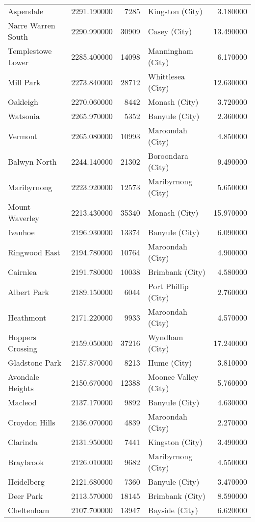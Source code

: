\begin{longtable}{lrrlr}
Aspendale & 2291.190000 & 7285 & Kingston (City) & 3.180000 \\
Narre Warren South & 2290.990000 & 30909 & Casey (City) & 13.490000 \\
Templestowe Lower & 2285.400000 & 14098 & Manningham (City) & 6.170000 \\
Mill Park & 2273.840000 & 28712 & Whittlesea (City) & 12.630000 \\
Oakleigh & 2270.060000 & 8442 & Monash (City) & 3.720000 \\
Watsonia & 2265.970000 & 5352 & Banyule (City) & 2.360000 \\
Vermont & 2265.080000 & 10993 & Maroondah (City) & 4.850000 \\
Balwyn North & 2244.140000 & 21302 & Boroondara (City) & 9.490000 \\
Maribyrnong & 2223.920000 & 12573 & Maribyrnong (City) & 5.650000 \\
Mount Waverley & 2213.430000 & 35340 & Monash (City) & 15.970000 \\
Ivanhoe & 2196.930000 & 13374 & Banyule (City) & 6.090000 \\
Ringwood East & 2194.780000 & 10764 & Maroondah (City) & 4.900000 \\
Cairnlea & 2191.780000 & 10038 & Brimbank (City) & 4.580000 \\
Albert Park & 2189.150000 & 6044 & Port Phillip (City) & 2.760000 \\
Heathmont & 2171.220000 & 9933 & Maroondah (City) & 4.570000 \\
Hoppers Crossing & 2159.050000 & 37216 & Wyndham (City) & 17.240000 \\
Gladstone Park & 2157.870000 & 8213 & Hume (City) & 3.810000 \\
Avondale Heights & 2150.670000 & 12388 & Moonee Valley (City) & 5.760000 \\
Macleod & 2137.170000 & 9892 & Banyule (City) & 4.630000 \\
Croydon Hills & 2136.070000 & 4839 & Maroondah (City) & 2.270000 \\
Clarinda & 2131.950000 & 7441 & Kingston (City) & 3.490000 \\
Braybrook & 2126.010000 & 9682 & Maribyrnong (City) & 4.550000 \\
Heidelberg & 2121.680000 & 7360 & Banyule (City) & 3.470000 \\
Deer Park & 2113.570000 & 18145 & Brimbank (City) & 8.590000 \\
Cheltenham & 2107.700000 & 13947 & Bayside (City) & 6.620000 \\

\end{longtable}
